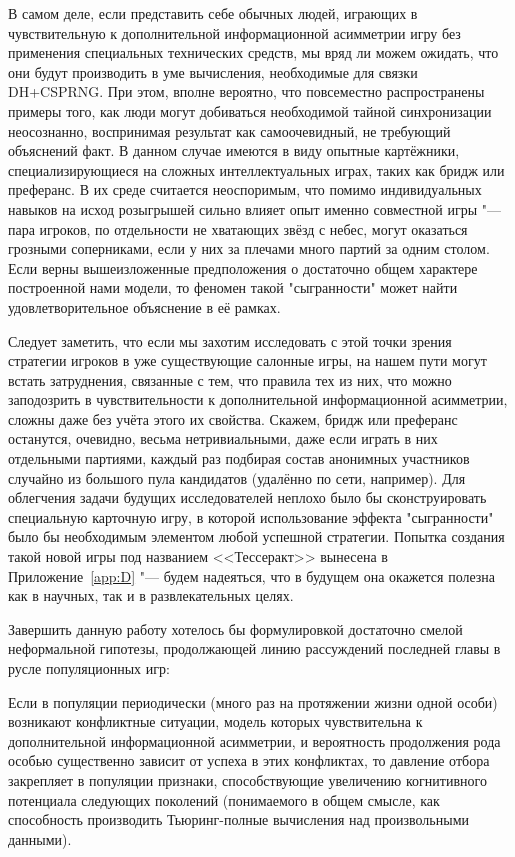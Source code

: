 В самом деле, если представить себе обычных людей, играющих в чувствительную к дополнительной информационной асимметрии игру без применения специальных технических средств, мы вряд ли можем ожидать, что они будут производить в уме вычисления, необходимые для связки DH+CSPRNG. При этом, вполне вероятно, что повсеместно распространены примеры того, как люди могут добиваться необходимой тайной синхронизации неосознанно, воспринимая результат как самоочевидный, не требующий объяснений факт. В данном случае имеются в виду опытные картёжники, специализирующиеся на сложных интеллектуальных играх, таких как бридж или преферанс. В их среде считается неоспоримым, что помимо индивидуальных навыков на исход розыгрышей сильно влияет опыт именно совместной игры "--- пара игроков, по отдельности не хватающих звёзд с небес, могут оказаться грозными соперниками, если у них за плечами много партий за одним столом. Если верны вышеизложенные предположения о достаточно общем характере построенной нами модели, то феномен такой "сыгранности" может найти удовлетворительное объяснение в её рамках.

Следует заметить, что если мы захотим исследовать с этой точки зрения стратегии игроков в уже существующие салонные игры, на нашем пути могут встать затруднения, связанные с тем, что правила тех из них, что можно заподозрить в чувствительности к дополнительной информационной асимметрии, сложны даже без учёта этого их свойства. Скажем, бридж или преферанс останутся, очевидно, весьма нетривиальными, даже если играть в них отдельными партиями, каждый раз подбирая состав анонимных участников случайно из большого пула кандидатов (удалённо по сети, например). Для облегчения задачи будущих исследователей неплохо было бы сконструировать специальную карточную игру, в которой использование эффекта "сыгранности" было бы необходимым элементом любой успешной стратегии. Попытка создания такой новой игры под названием <<Тессеракт>> вынесена в Приложение~\cref{app:D} "--- будем надеяться, что в будущем она окажется полезна как в научных, так и в развлекательных целях.

Завершить данную работу хотелось бы формулировкой достаточно смелой неформальной гипотезы, продолжающей линию рассуждений последней главы в русле популяционных игр:
\begin{conjecture}
	Если в популяции периодически (много раз на протяжении жизни одной особи) возникают конфликтные ситуации, модель которых чувствительна к дополнительной информационной асимметрии, и вероятность продолжения рода особью существенно зависит от успеха в этих конфликтах, то давление отбора закрепляет в популяции признаки, способствующие увеличению когнитивного потенциала следующих поколений (понимаемого в общем смысле, как способность производить Тьюринг-полные вычисления над произвольными данными).
\end{conjecture}

